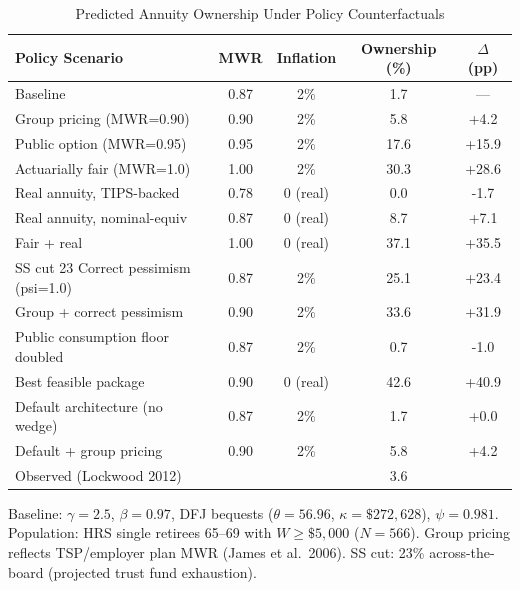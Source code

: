 \begin{table}[htbp]
\centering
\caption{Predicted Annuity Ownership Under Policy Counterfactuals}
\label{tab:counterfactuals}
\begin{tabular}{lcccc}
\toprule
Policy Scenario & MWR & Inflation & Ownership (\%) & $\Delta$ (pp) \\
\midrule
Baseline & 0.87 & 2\% & 1.7 & --- \\
\midrule
Group pricing (MWR=0.90) & 0.90 & 2\% & 5.8 & +4.2 \\
Public option (MWR=0.95) & 0.95 & 2\% & 17.6 & +15.9 \\
Actuarially fair (MWR=1.0) & 1.00 & 2\% & 30.3 & +28.6 \\
Real annuity, TIPS-backed & 0.78 & 0 (real) & 0.0 & -1.7 \\
Real annuity, nominal-equiv & 0.87 & 0 (real) & 8.7 & +7.1 \\
Fair + real & 1.00 & 0 (real) & 37.1 & +35.5 \\
SS cut 23%
Correct pessimism (psi=1.0) & 0.87 & 2\% & 25.1 & +23.4 \\
Group + correct pessimism & 0.90 & 2\% & 33.6 & +31.9 \\
Public consumption floor doubled & 0.87 & 2\% & 0.7 & -1.0 \\
Best feasible package & 0.90 & 0 (real) & 42.6 & +40.9 \\
Default architecture (no wedge) & 0.87 & 2\% & 1.7 & +0.0 \\
Default + group pricing & 0.90 & 2\% & 5.8 & +4.2 \\
\midrule
Observed (Lockwood 2012) & & & 3.6 & \\
\bottomrule
\end{tabular}
\begin{tablenotes}
\small
\item Baseline: $\gamma=2.5$, $\beta=0.97$, DFJ bequests
($\theta=56.96$, $\kappa=\$272{,}628$), $\psi=0.981$.
Population: HRS single retirees 65--69 with $W \geq \$5{,}000$ ($N=566$).
Group pricing reflects TSP/employer plan MWR (James et al.\ 2006).
SS cut: 23\% across-the-board (projected trust fund exhaustion).
\end{tablenotes}
\end{table}

